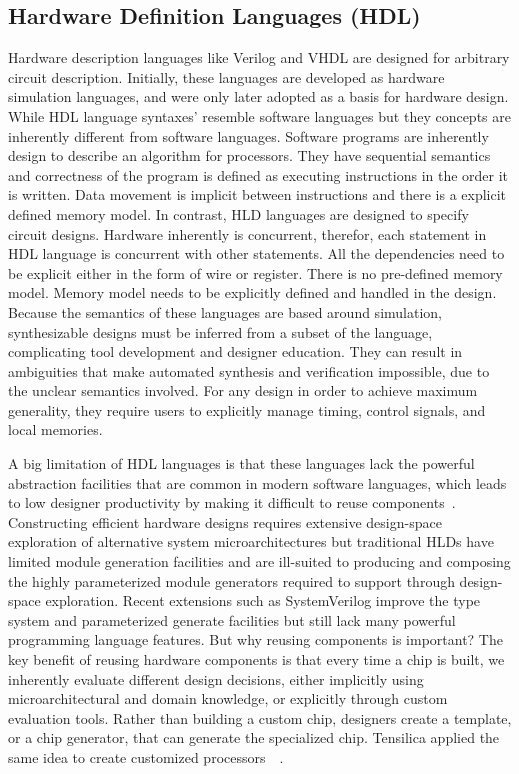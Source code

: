 

\subsection{Hardware Definition Languages (HDL)}

Hardware description languages like Verilog and VHDL are designed for arbitrary circuit description.
Initially, these languages are developed as hardware simulation languages, and were only later adopted as a basis for hardware design.
While HDL language syntaxes' resemble software languages but they concepts are inherently different from software languages.
Software programs are inherently design to describe an algorithm for processors.
They have sequential semantics and correctness of the program is defined as executing instructions in the order it is written. Data movement is implicit between instructions and there is a explicit defined memory model.
In contrast, HLD languages are designed to specify circuit designs.
Hardware inherently is concurrent, therefor, each statement in HDL language is concurrent with other statements.
All the dependencies need to be explicit either in the form of wire or register.
There is no pre-defined memory model. Memory model needs to be explicitly defined and handled in the design.
Because the semantics of these languages are based around simulation, synthesizable designs must be inferred from a subset of the language, complicating tool development and designer education.
They can result in ambiguities that make automated synthesis and verification impossible, due to the unclear semantics involved.
For any design in order to achieve maximum generality, they require users to explicitly manage timing, control signals, and local memories.

A big limitation of HDL languages is that these languages lack the powerful abstraction facilities that
are common in modern software languages, which leads to low designer productivity by making it difficult to reuse components~\cite{shacham_rethinking_2010}.
Constructing efficient hardware designs requires extensive design-space exploration of alternative system microarchitectures but traditional HLDs have limited module generation facilities and are ill-suited to producing and composing the highly parameterized module generators required to support through design-space exploration.
Recent extensions such as SystemVerilog improve the type system and parameterized generate facilities but still lack many powerful programming language features.
But why reusing components is important?
The key benefit of reusing hardware components is that every time a chip is built, we inherently evaluate different design decisions, either implicitly using microarchitectural and domain knowledge, or explicitly through custom evaluation tools.
Rather than building a custom chip, designers create a template, or a chip generator, that can generate the specialized chip. Tensilica applied the same idea to create customized processors~\cite{tensillica}~\cite{tensillica}.

